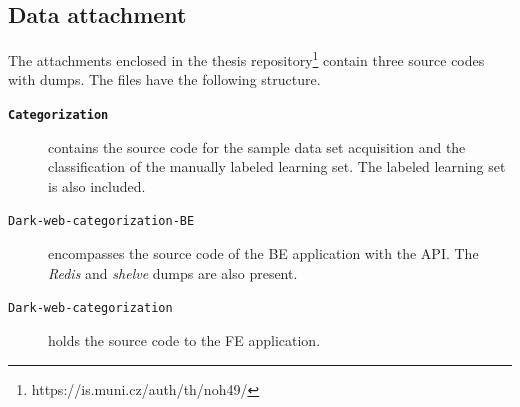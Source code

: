\begin{appendices}
\chapter{Data attachment}
The attachments enclosed in the thesis repository\footnote{https://is.muni.cz/auth/th/noh49/} contain three source codes with dumps. The files have the following structure.
\begin{description}
    \item[\textbf{\texttt{Categorization}}] contains the source code for the sample data set acquisition and the classification of the manually labeled learning set. The labeled learning set is also included.
    \item [\texttt{Dark-web-categorization-BE}] encompasses the source code of the BE application with the API. The \textit{Redis} and \textit{shelve} dumps are also present.
    \item [\texttt{Dark-web-categorization}] holds the source code to the FE application. 
\end{description}




\end{appendices}
